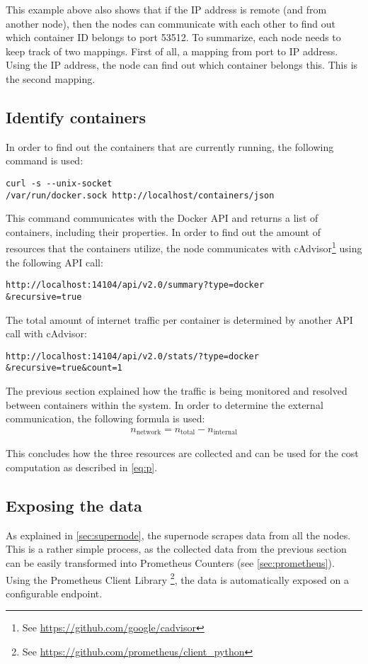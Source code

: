 \noindent
This example above also shows that if the IP address is remote (and from another node), then the nodes can communicate with each other to find out which container ID belongs to port 53512.
To summarize, each node needs to keep track of two mappings. First of all, a mapping from port to IP address. Using the IP address, the node can find out which container belongs this. This is the second mapping.

\subsection{Identify containers}
In order to find out the containers that are currently running, the following command is used:
\begin{verbatim}
curl -s --unix-socket 
/var/run/docker.sock http://localhost/containers/json
\end{verbatim}

\noindent
This command communicates with the Docker API and returns a list of containers, including their properties. In order to find out the amount of resources that the containers utilize, the node communicates with cAdvisor\footnote{See \url{https://github.com/google/cadvisor}} using the following API call:
\begin{verbatim}
http://localhost:14104/api/v2.0/summary?type=docker
&recursive=true
\end{verbatim}

\noindent
The total amount of internet traffic per container is determined by another API call with cAdvisor:
\begin{verbatim}
http://localhost:14104/api/v2.0/stats/?type=docker
&recursive=true&count=1
\end{verbatim}

\noindent
The previous section explained how the traffic is being monitored and resolved between containers within the system. In order to determine the external communication, the following formula is used:
\begin{align} \label{formula:traffic}
n_\text{network} = n_\text{total} - n_\text{internal}
\end{align}

\noindent
This concludes how the three resources are collected and can be used for the cost computation as described in \autoref{eq:p}.

\subsection{Exposing the data} \label{sec:exposing_data}
As explained in \autoref{sec:supernode}, the supernode scrapes data from all the nodes. This is a rather simple process, as the collected data from the previous section can be easily transformed into Prometheus Counters (see \autoref{sec:prometheus}). Using the Prometheus Client Library \footnote{See \url{https://github.com/prometheus/client_python}}, the data is automatically exposed on a configurable endpoint.\\


